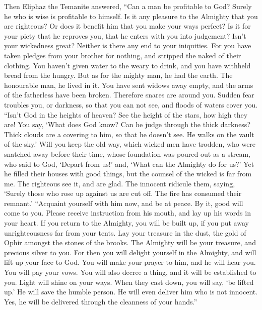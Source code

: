  Then Eliphaz the Temanite answered,  ``Can
a man be profitable to God? Surely he who is wise is profitable to
himself.  Is it any pleasure to the Almighty that you are
righteous? Or does it benefit him that you make your ways perfect?
 Is it for your piety that he reproves you, that he enters
with you into judgement?  Isn't your wickedness great?
Neither is there any end to your iniquities.  For you have
taken pledges from your brother for nothing, and stripped the naked of
their clothing.  You haven't given water to the weary to
drink, and you have withheld bread from the hungry.  But
as for the mighty man, he had the earth. The honourable man, he lived in
it.  You have sent widows away empty, and the arms of the
fatherless have been broken.  Therefore snares are around
you. Sudden fear troubles you,  or darkness, so that you
can not see, and floods of waters cover you.  ``Isn't God
in the heights of heaven? See the height of the stars, how high they
are!  You say, `What does God know? Can he judge through
the thick darkness?  Thick clouds are a covering to him,
so that he doesn't see. He walks on the vault of the sky.'
 Will you keep the old way, which wicked men have
trodden,  who were snatched away before their time, whose
foundation was poured out as a stream,  who said to God,
`Depart from us!' and, `What can the Almighty do for us?'
 Yet he filled their houses with good things, but the
counsel of the wicked is far from me.  The righteous see
it, and are glad. The innocent ridicule them,  saying,
`Surely those who rose up against us are cut off. The fire has consumed
their remnant.'  ``Acquaint yourself with him now, and be
at peace. By it, good will come to you.  Please receive
instruction from his mouth, and lay up his words in your heart.
 If you return to the Almighty, you will be built up, if
you put away unrighteousness far from your tents.  Lay
your treasure in the dust, the gold of Ophir amongst the stones of the
brooks.  The Almighty will be your treasure, and precious
silver to you.  For then you will delight yourself in the
Almighty, and will lift up your face to God.  You will
make your prayer to him, and he will hear you. You will pay your vows.
 You will also decree a thing, and it will be established
to you. Light will shine on your ways.  When they cast
down, you will say, `be lifted up.' He will save the humble person.
 He will even deliver him who is not innocent. Yes, he
will be delivered through the cleanness of your hands.''

